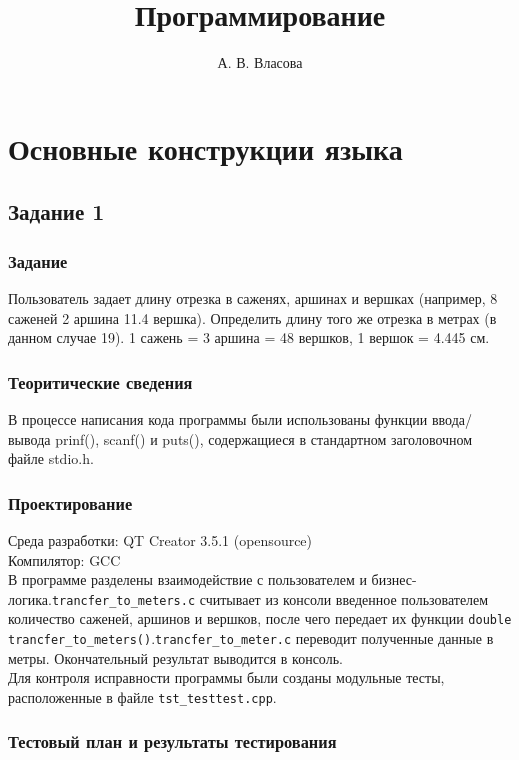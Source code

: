 \documentclass[12pt,a4paper]{report}
\author{А. В. Власова}
\title{Программирование}
\begin{document}
\maketitle
\chapter{Основные конструкции языка}
\section{Задание 1}
\subsection{Задание}
Пользователь задает длину отрезка в саженях, аршинах и вершках (например, 8 саженей 2 аршина 11.4 вершка). Определить длину того же отрезка в метрах (в данном случае 19). 1 сажень = 3 аршина = 48 вершков, 1 вершок = 4.445 см.
\subsection{Теоритические сведения}

В процессе написания кода программы были использованы функции ввода/вывода prinf(), scanf() и puts(), содержащиеся в стандартном заголовочном файле stdio.h. 


\subsection{Проектирование}

Среда разработки: QT Creator 3.5.1 (opensource)
\\
Компилятор: GCC
\\
В программе разделены взаимодействие с пользователем и бизнес-логика.\verb+trancfer_to_meters.c+  считывает из консоли введенное пользователем количество саженей, аршинов и вершков, после чего передает их функции \verb+double trancfer_to_meters()+.\verb+trancfer_to_meter.c+ переводит полученные данные в метры. Окончательный результат выводится в консоль.
\\
Для контроля исправности программы были созданы модульные тесты, расположенные в файле \verb+tst_testtest.cpp+.

\subsection{Тестовый план и результаты тестирования}
\end{document}
